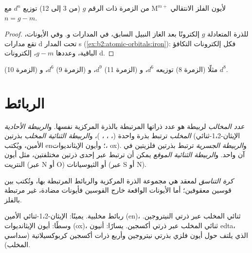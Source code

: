 \begin{proposition}[عدّ إلكترونات d]\label{prop:b2:coordination-complexes:dn}
لأيون الفلز الانتقالي $\mathrm M^{m+}$ من الزمرة ذات الرقم $g$ (من 3 إلى 12) توزيع $d^n$
مع $n = g - m$.
\end{proposition}

\begin{proof}
للذرة المتعادلة $g$ إلكترونًا بعد الغاز النبيل السابق، في المدارات  
و. وفي الأيونات، تقع مدارات d تحت المدار s
(\cref{ex:b2:atomic-orbitals:iron}): فكل إلكترونات التكافؤ الباقية، وعددها $g - m$، إلكترونات
d.
\end{proof}

مثلًا  (الزمرة 8) توزيعه $d^6$، و (الزمرة 11) $d^9$، و (الزمرة 9)
$d^6$، و (الزمرة 10) $d^8$.

\section{الربائط}

\begin{definition}\label{def:b2:coordination-complexes:denticity}
\emph{عدد المخالب} لربيطة هو عدد ذراتها المرتبطة
بالذرة المركزية نفسها. و\emph{الربيطة الأحادية المخلب} ترتبط
بذرة واحدة (، ، ، )، و\emph{الربيطة الثنائية
المخلب} بذرتين (الإيثان-1،2-ثنائي الأمين، ويُكتب en؛ 
وأيون الإيثانديوات، ox). و\emph{الربيطة الجسرية} ترتبط بذرتين
فلزيتين في آن واحد. و\emph{الربيطة الثنائية الموقع} يمكن أن ترتبط
عبر إحدى ذرتين مختلفتين، مثل أيون النتريت (عبر N أو O) أو
الثيوسيانات (عبر S أو N).
\end{definition}

\begin{definition}\label{def:b2:coordination-complexes:coordination-sphere}
\emph{كرة التناسق} لمعقد هي مجموعة
الذرة المركزية والربائط المرتبطة بها، وتُكتب بين قوسين معقوفين؛ أما الأيونات
الواقعة خارج القوسين فأيونات مضادة، غير مرتبطة بالفلز.
\end{definition}

\begin{omfigure}
\qquad
{}
\qquad
{}

\medskip
{\small ربائط مخلبية. يمينًا: الإيثان-1،2-ثنائي الأمين (en)، ثنائي المخلب عبر ذرتي
النيتروجين. وسطًا: أيون الإيثانديوات (ox)، ثنائي المخلب عبر ذرتي أكسجين. يسارًا:
أنيون edta، الذي يلتف حول أيون فلزي بذرتي نيتروجين وأربع ذرات
أكسجين كربوكسيلاتية (سداسي المخلب).}
\end{omfigure}

